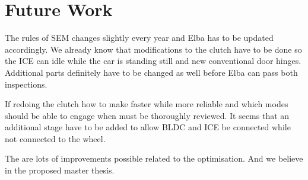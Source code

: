 \chapter{Future Work}
The rules of SEM changes slightly every year and Elba has to be updated accordingly. We 
already know that modifications to the clutch have to be done so the ICE can idle while the car is standing still and new conventional door hinges. Additional parts definitely have to be changed as well before Elba can pass both inspections.

If redoing the clutch how to make faster while more reliable and which modes should be able to engage when must be thoroughly reviewed. It seems that an additional stage have to be added to allow BLDC and ICE be connected while not connected to the wheel. 

The are lots of improvements possible related to the optimisation. And we believe in the proposed master thesis.













